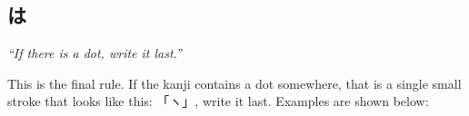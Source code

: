 \begin{figure}[H]\label{fig:PR;漢字;書き順;にょうがある最後}
	\centering
	
	\hspace{0.5in}
	
\end{figure}

\subsection*{は}\label{ssec:PR;漢字;書き順;点は最後}

\hspace*{24pt}\textit{``If there is a dot, write it last.''}

This is the final rule. If the kanji contains a dot somewhere, that is a single small stroke that looks like this: 「ヽ」, write it last. Examples are shown below:

\begin{figure}[H]\label{fig:PR;漢字;書き順;点は最後}
	\centering
	
	\hspace{0.5in}
	
\end{figure}
